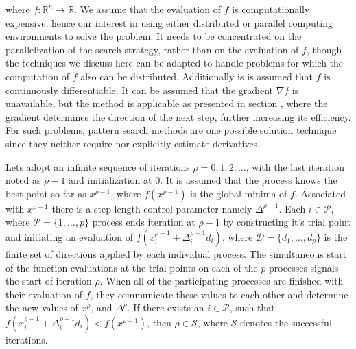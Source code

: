 		where $f:\mathbb{R}^n\longrightarrow\mathbb{R}$. We assume that the evaluation of $f$ is computationally expensive, hence our interest in using either distributed or parallel computing environments to solve the problem. It needs to be concentrated on the parallelization of the search strategy, rather than on the evaluation of $f$, though the techniques we discuss here can be adapted to handle problems for which the computation of $f$ also can be distributed. Additionally is is assumed that $f$ is continuously differentiable. It can be assumed that the gradient $\nabla f$ is unavailable, but the method is applicable as presented in section , where the gradient determines the direction of the next step, further increasing its efficiency. For such problems, pattern search methods are one possible solution technique since they neither require nor explicitly estimate derivatives.\\


Lets adopt an infinite sequence of iterations $\rho=0,1,2,\dots$, with the last iteration noted as $\rho-1$ and initialization at $0$. It is assumed that the process knows the best point so far as $x^{\rho-1}$, where $f(x^{\rho-1})$ is the global minima of $f$. Associated with $x^{\rho-1}$ there is a step-length control parameter namely $\Delta^{\rho-1}$. Each $i\in\mathcal{P}$, where $\mathcal{P}=\{1,\dots,p\}$ process ends iteration at $\rho-1$ by constructing it's trial point and initiating an evaluation of $f(x^{\rho-1}_i+\Delta^{\rho-1}_id_i)$, where $\mathcal{D}=\{d_1,\dots,d_p\}$ is the finite set of directions applied by each individual process. The simultaneous start of the function evaluations at the trial points on each of the $p$ processes signals the start of iteration $\rho$. When all of the participating processes are finished with their evaluation of $f$, they communicate these values to each other and determine the new values of $x^\rho$, and $\Delta^\rho$. If there exists an $i\in\mathcal{P}$, such that $f(x^{\rho-1}_i+\Delta^{\rho-1}_id_i)<f(x^{\rho-1})$, then $\rho\in\mathcal{S}$, where $\mathcal{S}$ denotes the successful iterations.


